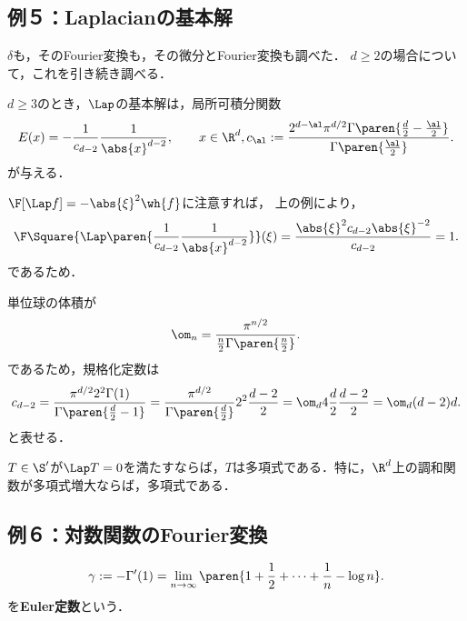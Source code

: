 \documentclass[uplatex,dvipdfmx]{jsreport}
\begin{document}
\subsection{例５：Laplacianの基本解}

\begin{tcolorbox}[colframe=ForestGreen, colback=ForestGreen!10!white,breakable,colbacktitle=ForestGreen!40!white,coltitle=black,fonttitle=\bfseries\sffamily,
title=]
    $\delta$も，そのFourier変換も，その微分とFourier変換も調べた．
    $d\ge2$の場合について，これを引き続き調べる．
\end{tcolorbox}

\begin{theorem}
    $d\ge3$のとき，$\Lap$の基本解は，局所可積分関数
    \[E(x)=-\frac{1}{c_{d-2}}\frac{1}{\abs{x}^{d-2}},\qquad x\in\R^d,c_\al:=\frac{2^{d-\al}\pi^{d/2}\Gamma\paren{\frac{d}{2}-\frac{\al}{2}}}{\Gamma\paren{\frac{\al}{2}}}.\]
    が与える．
\end{theorem}
\begin{Proof}
    $\F[\Lap f]=-\abs{\xi}^2\wh{f}$に注意すれば，
    上の例により，
    \[\F\Square{\Lap\paren{\frac{1}{c_{d-2}}\frac{1}{\abs{x}^{d-2}}}}(\xi)=\frac{\abs{\xi}^2c_{d-2}\abs{\xi}^{-2}}{c_{d-2}}=1.\]
    であるため．
\end{Proof}
\begin{remark}
    単位球の体積が
    \[\om_n=\frac{\pi^{n/2}}{\frac{n}{2}\Gamma\paren{\frac{n}{2}}}.\]
    であるため，規格化定数は
    \[c_{d-2}=\frac{\pi^{d/2}2^2\Gamma(1)}{\Gamma\paren{\frac{d}{2}-1}}=\frac{\pi^{d/2}}{\Gamma\paren{\frac{d}{2}}}2^2\frac{d-2}{2}=\om_d4\frac{d}{2}\frac{d-2}{2}=\om_d(d-2)d.\]
    と表せる．
\end{remark}

\begin{proposition}[Liouvilleの定理の一般化]
    $T\in\S'$が$\Lap T=0$を満たすならば，$T$は多項式である．特に，$\R^d$上の調和関数が多項式増大ならば，多項式である．
\end{proposition}

\subsection{例６：対数関数のFourier変換}

\begin{definition}
    \[\gamma:=-\Gamma'(1)=\lim_{n\to\infty}\paren{1+\frac{1}{2}+\cdots+\frac{1}{n}-\log n}.\]
    を\textbf{Euler定数}という．
\end{definition}
\end{document}
